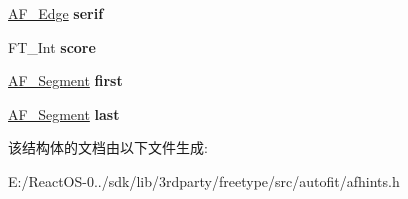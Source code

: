 \begin{DoxyCompactItemize}
\hyperlink{struct_a_f___edge_rec__}{A\+F\+\_\+\+Edge} {\bfseries serif}
\item 
\mbox{\label{struct_a_f___edge_rec___a7c399340f7574ef8a570bcb90882f1f1}} 
F\+T\+\_\+\+Int {\bfseries score}
\item 
\mbox{\label{struct_a_f___edge_rec___a57614243a3a4d8cebd088d7c9cbc80af}} 
\hyperlink{struct_a_f___segment_rec__}{A\+F\+\_\+\+Segment} {\bfseries first}
\item 
\mbox{\label{struct_a_f___edge_rec___a68730a288fd588ada62778918d563696}} 
\hyperlink{struct_a_f___segment_rec__}{A\+F\+\_\+\+Segment} {\bfseries last}
\end{DoxyCompactItemize}


该结构体的文档由以下文件生成\+:\begin{DoxyCompactItemize}
\item 
E\+:/\+React\+O\+S-\/0../sdk/lib/3rdparty/freetype/src/autofit/afhints.\+h\end{DoxyCompactItemize}

